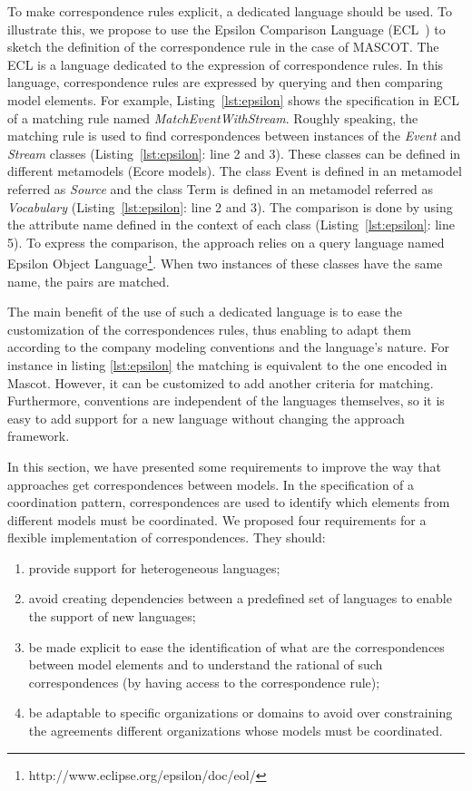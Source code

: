 To make correspondence rules explicit, a dedicated language should be used. To illustrate this, we propose to use the Epsilon Comparison Language (ECL~\cite{TODO_ECLComparisonLanguage}) to sketch the definition of the correspondence rule in the case of MASCOT. The ECL is a language dedicated to the expression of correspondence rules. In this language, correspondence rules are expressed by querying and then comparing model elements. For example, Listing~\ref{lst:epsilon} shows the specification in ECL of a matching rule named \emph{MatchEventWithStream}. Roughly speaking, the matching rule is used to find correspondences between instances of the \emph{Event} and \emph{Stream} classes (Listing~\ref{lst:epsilon}: line 2 and 3). These classes can be defined in different metamodels (\ie Ecore models). The class Event is defined in an metamodel referred as \emph{Source} and the class Term is defined in an metamodel referred as \emph{Vocabulary} (Listing~\ref{lst:epsilon}: line 2 and 3). The comparison is done by using the attribute name defined in the context of each class (Listing~\ref{lst:epsilon}: line 5). To express the comparison, the approach relies on a query language named Epsilon Object Language\footnote{http://www.eclipse.org/epsilon/doc/eol/}. When two instances of these classes have the same name, the pairs are matched.
	
The main benefit of the use of such a dedicated language is to ease the customization of the correspondences rules, thus enabling to adapt them according to the company modeling conventions and the language's nature. For instance in listing \ref{lst:epsilon} the matching is equivalent to the one encoded in Mascot. However, it can be customized to add another criteria for matching. Furthermore, conventions are independent of the languages themselves, so it is easy to add support for a new language without changing the approach framework.
	




In this section, we have presented some requirements to improve the way that approaches get correspondences between models. In the specification of a coordination pattern, correspondences are used to identify which elements from different models must be coordinated. We proposed four requirements for a flexible implementation of correspondences. They should: 
\begin{enumerate}
\item provide support for heterogeneous languages;
\item avoid creating dependencies between a predefined set of languages to enable the support of new languages;
\item be made explicit to ease the identification of what are the correspondences between model elements and to understand the rational of such correspondences (by having access to the correspondence rule);
\item be adaptable to specific organizations or domains to avoid over constraining the agreements different organizations whose models must be coordinated.
\end{enumerate}

